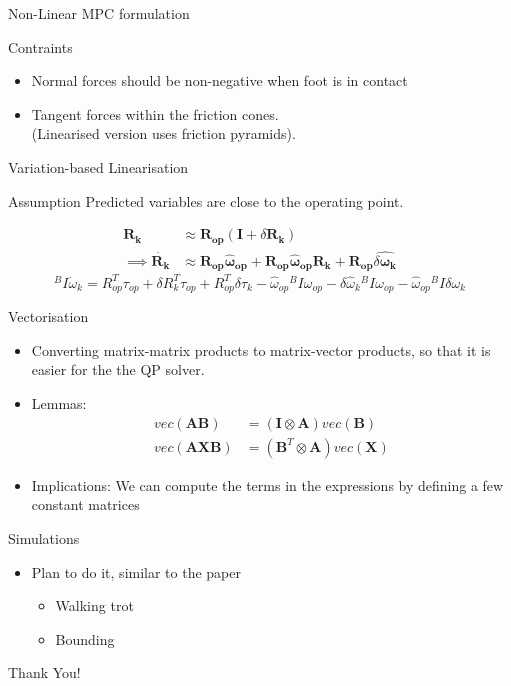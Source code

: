 \documentclass{beamer}
\begin{document}
\begin{frame}{Non-Linear MPC formulation}
\begin{block}{Contraints}
\begin{itemize}
    \item Normal forces should be non-negative when foot is in contact
    \item Tangent forces within the friction cones.\\
        (Linearised version uses friction pyramids).
\end{itemize}
\end{block}
\end{frame}

\begin{frame}{Variation-based Linearisation}
\begin{block}{Assumption}
    Predicted variables are close to the operating point.
\end{block}
\begin{align}
\mathbf{R_k} & \approx \mathbf{R_{op}} (\mathbf{I} + \delta \mathbf{R_k})
\\ \implies
\dot{\mathbf{R_k}} & \approx \mathbf{R_{op}}\mathbf{\hat \omega_{op}} + \mathbf{R_{op}}\mathbf{\hat\omega_{op}}\mathbf{R_k} + \mathbf{R_{op}}\widehat{\delta\mathbf{\omega_k}}
\end{align}
\begin{equation}
    ^B I \dot{\omega}_k = R_{op}^T \tau_{op} + \delta R_k^T \tau_{op} + R_{op}^T \delta \tau_k - \hat{\omega}_{op} {}^B I \omega_{op} - \delta \hat{\omega}_k {}^B I \omega_{op} - \hat{\omega}_{op} {}^B I \delta \omega_k
\end{equation}
\end{frame}

\begin{frame}{Vectorisation}
\begin{itemize}
    \item Converting matrix-matrix products to matrix-vector products, so that it is easier for the the QP solver.
    \item Lemmas:
        \begin{align}
            vec (\mathbf{AB}) & = (\mathbf{I} \otimes \mathbf{A}) vec(\mathbf{B})
            \\ 
            vec (\mathbf{AXB}) & = (\mathbf{B}^T \otimes \mathbf{A}) vec(\mathbf{X})
        \end{align}
    \item Implications:
    We can compute the terms in the expressions by defining a few constant matrices
\end{itemize}
\end{frame}

\begin{frame}{Simulations}
\begin{itemize}
    \item Plan to do it, similar to the paper
    \begin{itemize}
        \item Walking trot
        \item Bounding
    \end{itemize}
\end{itemize}
\end{frame}

\begin{frame}
	\LARGE{Thank You!}
\end{frame}\normalfont
\end{document}
